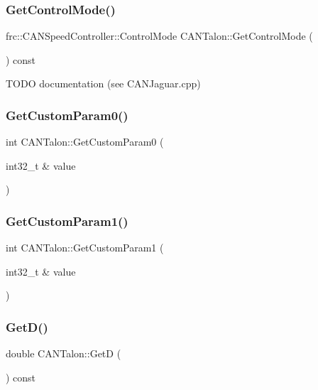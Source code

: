\subsubsection{\texorpdfstring{Get\+Control\+Mode()}{GetControlMode()}}
{\footnotesize\ttfamily frc\+::\+C\+A\+N\+Speed\+Controller\+::\+Control\+Mode C\+A\+N\+Talon\+::\+Get\+Control\+Mode (\begin{DoxyParamCaption}{ }\end{DoxyParamCaption}) const\hspace{0.3cm}{\ttfamily [virtual]}}

T\+O\+DO documentation (see C\+A\+N\+Jaguar.\+cpp) \mbox{\label{class_c_a_n_talon_a4c91d3575d4a94a26286f83e8b3efa0a}} 
\subsubsection{\texorpdfstring{Get\+Custom\+Param0()}{GetCustomParam0()}}
{\footnotesize\ttfamily int C\+A\+N\+Talon\+::\+Get\+Custom\+Param0 (\begin{DoxyParamCaption}\item[{int32\+\_\+t \&}]{value }\end{DoxyParamCaption})}

\mbox{\label{class_c_a_n_talon_a0cf96267919f28e4c58037637d3832b2}} 
\subsubsection{\texorpdfstring{Get\+Custom\+Param1()}{GetCustomParam1()}}
{\footnotesize\ttfamily int C\+A\+N\+Talon\+::\+Get\+Custom\+Param1 (\begin{DoxyParamCaption}\item[{int32\+\_\+t \&}]{value }\end{DoxyParamCaption})}

\mbox{\label{class_c_a_n_talon_aeae71b2de2e9c711f46a9a2e3ce08282}} 
\subsubsection{\texorpdfstring{Get\+D()}{GetD()}}
{\footnotesize\ttfamily double C\+A\+N\+Talon\+::\+GetD (\begin{DoxyParamCaption}{ }\end{DoxyParamCaption}) const\hspace{0.3cm}{\ttfamily [override]}}

